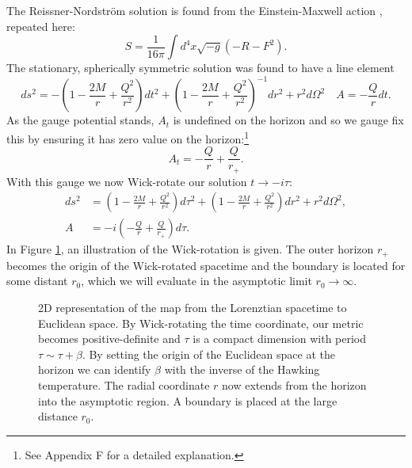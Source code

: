 The Reissner-Nordstr\"om solution is found from the Einstein-Maxwell action , repeated here:
\begin{equation*}
		S = \frac{1}{16\pi} \int d^4x \sqrt{-g} (-R - F^2).
\end{equation*}
The stationary, spherically symmetric solution was found to have a line element 
\begin{equation*}
  ds^2 =  -\left( 1 - \frac{2M}{r} + \frac{Q^2}{r^2} \right) dt^2 + \left( 1 - \frac{2M}{r} + \frac{Q^2}{r^2} \right)^{-1} dr^2 + r^2 d\Omega^2	 \quad A = - \frac{Q}{r} dt.
\end{equation*}
As the gauge potential stands, $A_t$ is undefined on the horizon and so we gauge fix this by ensuring it has zero value on the horizon:\footnote{See \cite{Dempster:2016} Appendix F for a detailed explanation.}
\begin{equation*}
	A_t = -\frac{Q}{r} + \frac{Q}{r_+}.
\end{equation*}
With this gauge we now Wick-rotate our solution $t \rightarrow -i \tau$:
\begin{equation*}
\begin{aligned}
	ds^2 &= \left( 1 - \frac{2M}{r} + \frac{Q^2}{r^2} \right) d\tau^2 + \left( 1 - \frac{2M}{r} + \frac{Q^2}{r^2} \right) dr^2 + r^2 d\Omega^2, \\
	A &= -i\left(-\frac{Q}{r} + \frac{Q}{r_+} \right)  d\tau .
\end{aligned}
\end{equation*}
In Figure \ref{fig:wickrot}, an illustration of the Wick-rotation is given. The outer horizon $r_+$ becomes the origin of the Wick-rotated spacetime and the boundary is located for some distant $r_0$, which we will evaluate in the asymptotic limit $r_0 \rightarrow \infty$. 

\begin{figure}[h!]
\centering
{}
\caption[Illustration of manifolds during Wick-rotation]{2D representation of the map from the Lorenztian spacetime to Euclidean space. By Wick-rotating the time coordinate, our metric becomes positive-definite and $\tau$ is a compact dimension with period $\tau \sim \tau + \beta$. By setting the origin of the Euclidean space at the horizon we can identify $\beta$ with the inverse of the Hawking temperature. The radial coordinate $r$ now extends from the horizon into the asymptotic region. A boundary is placed at the large distance $r_0$.}
\label{fig:wickrot}
\end{figure}

